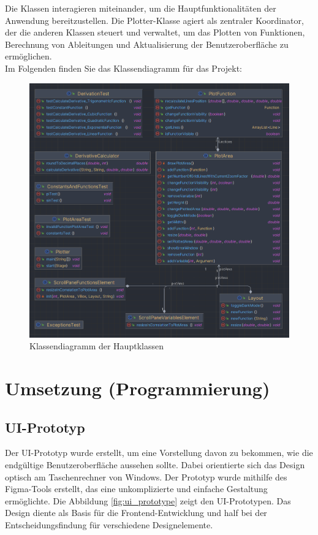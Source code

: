 \documentclass[a4paper]{article}
\begin{document}
Die Klassen interagieren miteinander, um die Hauptfunktionalitäten der Anwendung bereitzustellen. Die Plotter-Klasse agiert als zentraler Koordinator, der die anderen Klassen steuert und verwaltet, um das Plotten von Funktionen, Berechnung von Ableitungen und Aktualisierung der Benutzeroberfläche zu ermöglichen.\\
Im Folgenden finden Sie das Klassendiagramm für das Projekt:

\begin{figure}[h]
	\centering
	\includegraphics[width=\textwidth]{Resources/class_diagram.png}
	\caption{Klassendiagramm der Hauptklassen}
	\label{fig:class_diagram}
\end{figure}

\newpage

\section{Umsetzung (Programmierung)}

\subsection{UI-Prototyp}

Der UI-Prototyp wurde erstellt, um eine Vorstellung davon zu bekommen, wie die endgültige Benutzeroberfläche aussehen sollte. Dabei orientierte sich das Design optisch am Taschenrechner von Windows. Der Prototyp wurde mithilfe des Figma-Tools erstellt, das eine unkomplizierte und einfache Gestaltung ermöglichte. Die Abbildung \ref{fig:ui_prototype} zeigt den UI-Prototypen. Das Design diente als Basis für die Frontend-Entwicklung und half bei der Entscheidungsfindung für verschiedene Designelemente.
\end{document}
